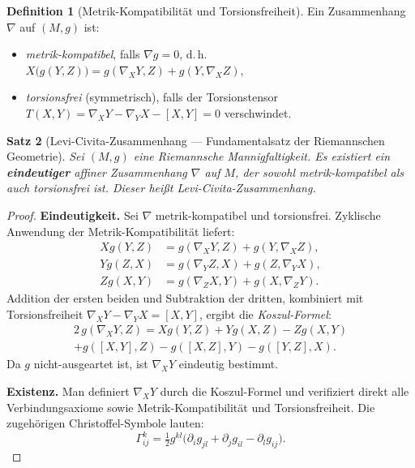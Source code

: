 \documentclass[12pt,a4paper]{amsart}
\newtheorem{theorem}{Satz}[section]
\theoremstyle{definition}
\newtheorem{definition}[theorem]{Definition}
\begin{document}
\begin{definition}[Metrik-Kompatibilität und Torsionsfreiheit]
Ein Zusammenhang $\nabla$ auf $(M, g)$ ist:
\begin{itemize}
  \item \emph{metrik-kompatibel}, falls $\nabla g = 0$, d.\,h.
        $X\bigl(g(Y,Z)\bigr) = g(\nabla_X Y, Z) + g(Y, \nabla_X Z)$,
  \item \emph{torsionsfrei} (symmetrisch), falls der Torsionstensor
        $T(X,Y) = \nabla_X Y - \nabla_Y X - [X,Y] = 0$ verschwindet.
\end{itemize}
\end{definition}

\begin{theorem}[Levi-Civita-Zusammenhang --- Fundamentalsatz der Riemannschen Geometrie]
\label{thm:levi-civita}
Sei $(M, g)$ eine Riemannsche Mannigfaltigkeit. Es existiert ein \textbf{eindeutiger}
affiner Zusammenhang $\nabla$ auf $M$, der sowohl metrik-kompatibel als auch
torsionsfrei ist. Dieser heißt \emph{Levi-Civita-Zusammenhang}.
\end{theorem}

\begin{proof}
\textbf{Eindeutigkeit.} Sei $\nabla$ metrik-kompatibel und torsionsfrei.
Zyklische Anwendung der Metrik-Kompatibilität liefert:
\begin{align*}
  Xg(Y,Z) &= g(\nabla_X Y, Z) + g(Y, \nabla_X Z), \\
  Yg(Z,X) &= g(\nabla_Y Z, X) + g(Z, \nabla_Y X), \\
  Zg(X,Y) &= g(\nabla_Z X, Y) + g(X, \nabla_Z Y).
\end{align*}
Addition der ersten beiden und Subtraktion der dritten, kombiniert mit
Torsionsfreiheit $\nabla_X Y - \nabla_Y X = [X,Y]$, ergibt die
\emph{Koszul-Formel}:
\begin{multline*}
  2\,g(\nabla_X Y, Z) = Xg(Y,Z) + Yg(X,Z) - Zg(X,Y) \\
    + g([X,Y], Z) - g([X,Z], Y) - g([Y,Z], X).
\end{multline*}
Da $g$ nicht-ausgeartet ist, ist $\nabla_X Y$ eindeutig bestimmt.

\textbf{Existenz.} Man definiert $\nabla_X Y$ durch die Koszul-Formel und
verifiziert direkt alle Verbindungsaxiome sowie Metrik-Kompatibilität und
Torsionsfreiheit. Die zugehörigen Christoffel-Symbole lauten:
\[
  \Gamma^k_{ij} = \tfrac{1}{2} g^{kl}
  \bigl(\partial_i g_{jl} + \partial_j g_{il} - \partial_l g_{ij}\bigr).
\]
\end{proof}
\end{document}
